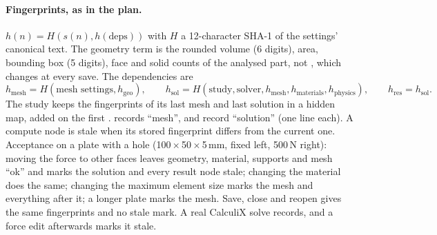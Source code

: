 \paragraph{Fingerprints, as in the plan.} $h(n)=H(s(n),h(\mathrm{deps}))$ with $H$ a 12-character SHA-1 of the
settings' canonical text. The geometry term is the rounded volume (6 digits), area, bounding box (5 digits), face and
solid counts of the analysed part, not , which changes at every save. The dependencies are
\[
  h_\mathrm{mesh}=H(\text{mesh settings},h_\mathrm{geo}),\qquad
  h_\mathrm{sol}=H(\text{study},\text{solver},h_\mathrm{mesh},h_\mathrm{materials},h_\mathrm{physics}),\qquad
  h_\mathrm{res}=h_\mathrm{sol}.
\]
The study keeps the fingerprints of its last mesh and last solution in a hidden  map, added on
the first .  records ``mesh'',  and 
record ``solution'' (one line each). A compute node is stale when its stored fingerprint differs from the current one.
Acceptance on a plate with a hole (100\,$\times$\,50\,$\times$\,5\,mm, fixed left, 500\,N right): moving the force to
other faces leaves geometry, material, supports and mesh ``ok'' and marks the solution and every result node stale;
changing the material does the same; changing the maximum element size marks the mesh and everything after it; a longer
plate marks the mesh. Save, close and reopen gives the same fingerprints and no stale mark. A real CalculiX solve
records, and a force edit afterwards marks it stale.

